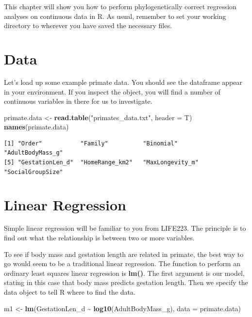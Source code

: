 \documentclass[
]{book}
\newenvironment{Shaded}{\begin{snugshade}}{\end{snugshade}}
\newcommand{\DataTypeTok}[1]{\textcolor[rgb]{0.13,0.29,0.53}{#1}}
\newcommand{\KeywordTok}[1]{\textcolor[rgb]{0.13,0.29,0.53}{\textbf{#1}}}
\newcommand{\NormalTok}[1]{#1}
\newcommand{\OperatorTok}[1]{\textcolor[rgb]{0.81,0.36,0.00}{\textbf{#1}}}
\newcommand{\StringTok}[1]{\textcolor[rgb]{0.31,0.60,0.02}{#1}}
\begin{document}
This chapter will show you how to perform phylogenetically correct regression analyses on continuous data in R. As usual, remember to set your working directory to wherever you have saved the necessary files.

\hypertarget{data-4}{%
\section{Data}\label{data-4}}

Let's load up some example primate data. You should see the dataframe appear in your environment. If you inspect the object, you will find a number of continuous variables in there for us to investigate.

\begin{Shaded}
\begin{Highlighting}[]
\NormalTok{primate.data \textless{}{-}}\StringTok{ }\KeywordTok{read.table}\NormalTok{(}\StringTok{"primates\_data.txt"}\NormalTok{, }\DataTypeTok{header =}\NormalTok{ T)}
\KeywordTok{names}\NormalTok{(primate.data)}
\end{Highlighting}
\end{Shaded}

\begin{verbatim}
[1] "Order"           "Family"          "Binomial"        "AdultBodyMass_g"
[5] "GestationLen_d"  "HomeRange_km2"   "MaxLongevity_m"  "SocialGroupSize"
\end{verbatim}

\hypertarget{linear-regression}{%
\section{Linear Regression}\label{linear-regression}}

Simple linear regression will be familiar to you from LIFE223. The principle is to find out what the relationship is between two or more variables.

To see if body mass and gestation length are related in primate, the best way to go would seem to be a traditional linear regression. The function to perform an ordinary least squares linear regression is \textbf{lm()}. The first argument is our model, stating in this case that body mass predicts gestation length. Then we specify the data object to tell R where to find the data.

\begin{Shaded}
\begin{Highlighting}[]
\NormalTok{m1 \textless{}{-}}\StringTok{ }\KeywordTok{lm}\NormalTok{(GestationLen\_d }\OperatorTok{\textasciitilde{}}\StringTok{ }\KeywordTok{log10}\NormalTok{(AdultBodyMass\_g), }\DataTypeTok{data =}\NormalTok{ primate.data)}
\end{Highlighting}
\end{Shaded}
\end{document}
